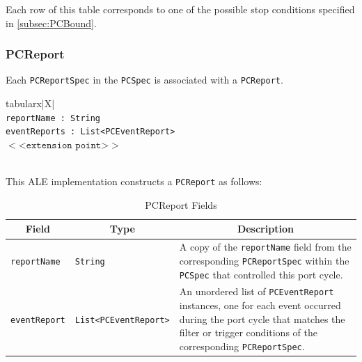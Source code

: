 \documentclass[11pt,a4paper,oneside]{article}
\newenvironment{bbox}%
{\begin{table}[h!]\begin{threeparttable}}%
{\end{threeparttable}\end{table}\FloatBarrier}
\newenvironment{bbox}
{\ifvmode\IgnorePar\fi \EndP\Tg<div class='bbox'>}{\Tg</div>\IgnoreIndent}
\begin{document}
Each row of this table corresponds to one of the possible stop conditions specified in \ref{subsec:PCBound}.

\subsubsection{PCReport}
\label{subsec:PCReport}
Each \texttt{PCReportSpec} in the \texttt{PCSpec} is associated with a \texttt{PCReport}.

\begin{bbox}
\begin{edtable}{tabularx}{\linewidth}{|X|}
\hline 
{}
\\
\texttt{reportName : String}\\
\texttt{eventReports : List<PCEventReport>}\\
$<$<$\texttt{extension point}$>$>$\\
\texttt{\textendash \textendash \textendash}\\
\hline
\end{edtable}
\end{bbox}

This ALE implementation constructs a \texttt{PCReport} as follows:

\begin{table}[!h]
\begin{tabular}{
  |p{}%
  |p{}%
  |p{}|%
  }
\hline
\multicolumn{1}{|c|}{\textbf{Field}}&
\multicolumn{1}{c|}{\textbf{Type}}&
\multicolumn{1}{c|}{\textbf{Description}}\\
\hline 
\texttt{reportName} &\texttt{String}&A copy of the \texttt{reportName} field from the corresponding \texttt{PCReportSpec} within the \texttt{PCSpec} that controlled this port cycle.\\ \hline 
\texttt{eventReport} &\texttt{List}\newline\texttt{<PCEventReport>}&An unordered list of \texttt{PCEventReport} instances, one for each event occurred during the port cycle that matches the filter or trigger conditions of the corresponding \texttt{PCReportSpec}.\\ \hline 
\end{tabular}
\caption{PCReport Fields}
\MakeLineNo
\end{table}
\FloatBarrier
\end{document}
